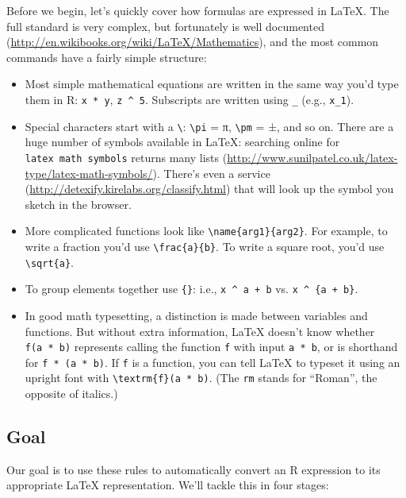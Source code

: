 \documentclass[]{book}
\renewcommand{\href}[2]{#2 (\url{#1})}
\begin{document}
Before we begin, let's quickly cover how formulas are expressed in LaTeX. The full standard is very complex, but fortunately is \href{http://en.wikibooks.org/wiki/LaTeX/Mathematics}{well documented}, and the most common commands have a fairly simple structure:

\begin{itemize}
\item
  Most simple mathematical equations are written in the same way you'd type
  them in R: \texttt{x\ *\ y}, \texttt{z\ \^{}\ 5}. Subscripts are written using \texttt{\_} (e.g., \texttt{x\_1}).
\item
  Special characters start with a \texttt{\textbackslash{}}: \texttt{\textbackslash{}pi} = π, \texttt{\textbackslash{}pm} = ±, and so on.
  There are a huge number of symbols available in LaTeX: searching online for
  \texttt{latex\ math\ symbols} returns many
  \href{http://www.sunilpatel.co.uk/latex-type/latex-math-symbols/}{lists}.
  There's even \href{http://detexify.kirelabs.org/classify.html}{a service} that
  will look up the symbol you sketch in the browser.
\item
  More complicated functions look like \texttt{\textbackslash{}name\{arg1\}\{arg2\}}. For example, to
  write a fraction you'd use \texttt{\textbackslash{}frac\{a\}\{b\}}. To write a square root, you'd use
  \texttt{\textbackslash{}sqrt\{a\}}.
\item
  To group elements together use \texttt{\{\}}: i.e., \texttt{x\ \^{}\ a\ +\ b} vs. \texttt{x\ \^{}\ \{a\ +\ b\}}.
\item
  In good math typesetting, a distinction is made between variables and
  functions. But without extra information, LaTeX doesn't know whether
  \texttt{f(a\ *\ b)} represents calling the function \texttt{f} with input \texttt{a\ *\ b},
  or is shorthand for \texttt{f\ *\ (a\ *\ b)}. If \texttt{f} is a function, you can tell
  LaTeX to typeset it using an upright font with \texttt{\textbackslash{}textrm\{f\}(a\ *\ b)}.
  (The \texttt{rm} stands for ``Roman'', the opposite of italics.)
\end{itemize}

\hypertarget{goal-1}{%
\subsection{Goal}\label{goal-1}}

Our goal is to use these rules to automatically convert an R expression to its appropriate LaTeX representation. We'll tackle this in four stages:
\end{document}
